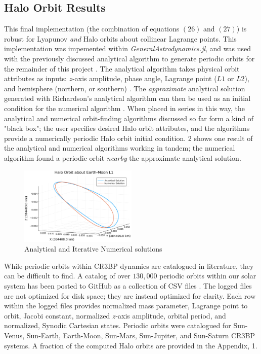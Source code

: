\documentclass[conf]{new-aiaa}
\begin{document}
\begin{multicols*}{2}
\subsection{Halo Orbit Results}
This final implementation (the combination of equations $(26)$ and $(27)$) 
is robust for Lyapunov \textit{and} Halo orbits about collinear Lagrange points. 
This implementation was impemented within \textit{GeneralAstrodynamics.jl}, and 
was used with the previously discussed analytical algorithm to generate 
periodic orbits for the remainder of this project \cite{carpinelli2020astro}.
The analytical algorithm takes physical orbit attributes as inputs: $z$-axis 
amplitude, phase angle, Lagrange point ($L1$ or $L2$), and hemisphere 
(northern, or southern) \cite{rund2018interplanetary}. 
The \textit{approximate} analytical solution generated 
with Richardson's analytical algorithm can then be used as an initial 
condition for the numerical algorithm \cite{rund2018interplanetary} 
\cite{richardson1980analytical}. When placed in series in this way, the 
analytical and numerical orbit-finding algorithms discussed so far form a 
kind of "black box"; the user specifies desired Halo orbit attributes, 
and the algorithms provide a numerically periodic Halo orbit initial condition.
\figurename{2} shows one result of the analytical and numerical algorithms 
working in tandem; the numerical algorithm found a periodic orbit \textit{nearby}
the approximate analytical solution. 

\begin{figure}[H]
    \hskip -0.3cm
    \includegraphics[width=0.5\textwidth]{analytical_numerical_halo.png}
    \caption{Analytical and Iterative Numerical solutions}
\end{figure}

While periodic orbits within CR3BP dynamics are catalogued in literature,
they can be difficult to find. A catalog of over $130,000$ periodic orbits 
within our solar system has been posted to GitHub as a collection of CSV files 
\cite{carpinelli2020halos}. The logged files are not optimized for disk 
space; they are instead optimized for clarity. Each row within the logged files 
provides normalized mass parameter, Lagrange point to orbit, Jacobi constant,
normalized $z$-axis amplitude, orbital period, and  
normalized, Synodic Cartesian states. Periodic orbits were catalogued for 
Sun-Venus, Sun-Earth, Earth-Moon, Sun-Mars, Sun-Jupiter, and Sun-Saturn CR3BP 
systems. A fraction of the computed Halo orbits are provided in the Appendix, 
\tablename{1}.


\end{multicols*}
\end{document}
